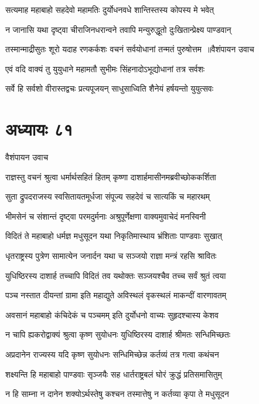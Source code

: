 \twolineshloka
{सत्यमाह महाबाहो सहदेवो महामतिः}
{दुर्योधनवधे शान्तिस्तस्य कोपस्य मे भवेत्}


\twolineshloka
{न जानासि यथा दृष्ट्वा चीराजिनधरान्वने}
{तवापि मन्युरुद्धूतो दुःखितान्प्रेक्ष्य पाण्डवान्}


\threelineshloka
{तस्मान्माद्रीसुतः शूरो यदाह रणकर्कशः}
{वचनं सर्वयोधानां तन्मतं पुरुषोत्तम ॥वैशंपायन उवाच}
{}


\twolineshloka
{एवं वदि वाक्यं तु युयुधाने महामतौ}
{सुभीमः सिंहनादोऽभूद्योधानां तत्र सर्वशः}


\twolineshloka
{सर्वे हि सर्वशो वीरास्तद्वचः प्रत्यपूजयन्}
{साधुसाध्विति शैनेयं हर्षयन्तो युयुत्सवः}


\chapter{अध्यायः ८१}
\twolineshloka
{वैशंपायन उवाच}
{}


\twolineshloka
{राज्ञस्तु वचनं श्रुत्वा धर्मार्थसहितं हितम्}
{कृष्णा दाशार्हमासीनमब्रवीच्छोककर्शिता}


\twolineshloka
{सुता द्रुपदराजस्य स्वसितायतमूर्धजा}
{संपूज्य सहदेवं च सात्यकिं च महारथम्}


\twolineshloka
{भीमसेनं च संशान्तं दृष्ट्वा परमदुर्मनाः}
{अश्रुपूर्णेक्षणा वाक्यमुवाचेदं मनस्विनी}


\twolineshloka
{विदितं ते महाबाहो धर्मज्ञ मधुसूदन}
{यथा निकृतिमास्थाय भ्रंशिताः पाण्डवाः सुखात्}


\twolineshloka
{धृतराष्ट्रस्य पुत्रेण सामात्येन जनार्दन}
{यथा च सञ्जयो राज्ञा मन्त्रं रहसि श्रावितः}


\twolineshloka
{युधिष्ठिरस्य दाशार्ह तच्चापि विदितं तव}
{यथोक्तः सञ्जयश्चैव तच्च सर्वं श्रुतं त्वया}


\twolineshloka
{पञ्च नस्तात दीयन्तां ग्रामा इति महाद्युते}
{अविस्थलं वृकस्थलं माकन्दीं वारणावतम्}


\twolineshloka
{अवसानं महाबाहो कंचिदेकं च पञ्चमम्}
{इति दुर्योधनो वाच्यः सुहृदश्चास्य केशव}


\twolineshloka
{न चापि ह्यकरोद्वाक्यं श्रुत्वा कृष्ण सुयोधनः}
{युधिष्ठिरस्य दाशार्ह श्रीमतः सन्धिमिच्छतः}


\twolineshloka
{अप्रदानेन राज्यस्य यदि कृष्ण सुयोधनः}
{सन्धिमिच्छेन्न कर्तव्यं तत्र गत्वा कथंचन}


\twolineshloka
{शक्ष्यन्ति हि महाबाहो पाण्डवाः सृञ्जयैः सह}
{धार्तराष्ट्रबलं घोरं क्रुद्धं प्रतिसमासितुम्}


\twolineshloka
{न हि साम्ना न दानेन शक्योऽर्थस्तेषु कश्चन}
{तस्मात्तेषु न कर्तव्या कृपा ते मधुसूदन}


